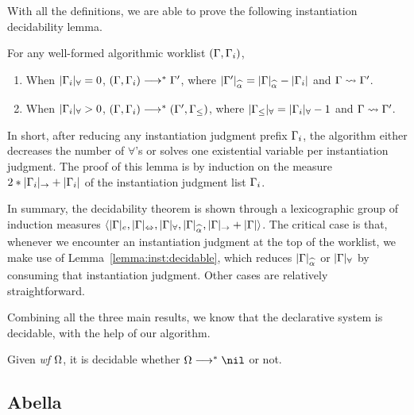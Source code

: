 With all the definitions, we are able to prove the following instantiation decidability lemma.

\begin{lemma}\label{lemma:inst:decidable}
For any well-formed algorithmic worklist $(\Gamma, \Gamma_i)$,
\begin{enumerate}[1)]
    \item When $|\Gamma_i|_\forall = 0$, $(\Gamma, \Gamma_i) \longrightarrow^* \Gamma'$,
        where $|\Gm'|_{\al} = |\Gm|_{\al} - |\Gm_i|$ and $\Gamma\rightsquigarrow\Gamma'$.
    \item When $|\Gamma_i|_\forall > 0$, $(\Gamma, \Gamma_i) \longrightarrow^* (\Gamma', \Gamma_\le)$,
        where $|\Gamma_\le|_\forall = |\Gamma_i|_\forall - 1$ and $\Gamma\rightsquigarrow\Gamma'$.
\end{enumerate}
\end{lemma}

In short, after reducing any instantiation judgment prefix $\Gamma_i$,
the algorithm either decreases the number of $\forall$'s
or solves one existential variable per instantiation judgment.
The proof of this lemma is by induction on the measure $2*|\Gamma_i|_\to + |\Gamma_i|$
of the instantiation judgment list $\Gamma_i$.

In summary, the decidability theorem is shown through a lexicographic group of induction measures
$\langle |\Gm|_e, |\Gm|_\Leftrightarrow, |\Gm|_\forall, |\Gm|_{\al}, |\Gm|_\to + |\Gm| \rangle$.
The critical case is that, whenever we encounter an instantiation judgment at the top of the worklist,
we make use of Lemma~\ref{lemma:inst:decidable}, which reduces $|\Gm|_{\al}$ or $|\Gamma|_\forall$
by consuming that instantiation judgment. Other cases are relatively straightforward.

Combining all the three main results, we know that the declarative system is decidable,
with the help of our algorithm.
\begin{corollary}
Given \emph{wf }$\Omega$, it is decidable whether $\Om\redto\nil$ or not.
\end{corollary}
\subsection{Abella}
